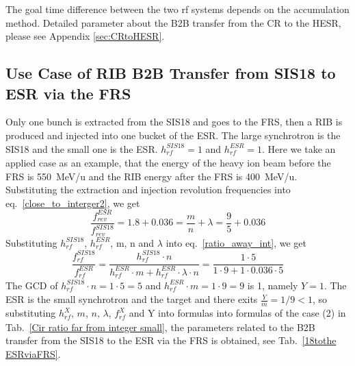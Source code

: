 The goal time difference between the two rf systems depends on the accumulation method. Detailed parameter about the B2B transfer from the CR to the HESR, please see Appendix \ref{sec:CRtoHESR}. 
\subsection{Use Case of RIB B2B Transfer from SIS18 to ESR via the FRS} 
Only one bunch is extracted from the SIS18 and goes to the FRS, then a RIB is produced and injected into one bucket of the ESR. The large synchrotron is the SIS18 and the small one is the ESR. $h^{\mathit{SIS18}}_\mathit{rf}=1$ and $h^{\mathit{ESR}}_\mathit{rf}=1$. Here we take an applied case as an example, that the energy of the heavy ion beam before the FRS is \SI{550}{MeV/\atomicmassunit} and the RIB energy after the FRS is \SI{400}{MeV/\atomicmassunit}. Substituting the extraction and injection revolution frequencies into eq.~\ref{close_to_interger2}, we get
\begin{equation} 
\frac{f_{\mathit{rev}}^{\mathit{ESR}}}{f_{\mathit{rev}}^{\mathit{SIS18}}}=1.8+0.036=\frac{m}{n}+ \lambda=\frac{9}{5}+0.036
\end{equation}
Substituting $h^{\mathit{SIS18}}_\mathit{rf}$, $h^{\mathit{ESR}}_\mathit{rf}$, m, n and $\lambda$ into eq.~\ref{ratio_away_int}, we get
\begin{equation}
\frac{f_{\mathit{rf}}^{\mathit{SIS18}}}{f_{\mathit{rf}}^{\mathit{ESR}}}=\frac{h^{\mathit{SIS18}}_\mathit{rf}\cdot n}{h^{\mathit{ESR}}_\mathit{rf} \cdot m+ h^{\mathit{ESR}}_\mathit{rf} \cdot\lambda\cdot n}=\frac{1\cdot 5}{1 \cdot 9+1 \cdot0.036\cdot 5}
\end{equation}
The GCD of $h^{\mathit{SIS18}}_\mathit{rf}\cdot n=1\cdot5=5$ and $h^{\mathit{ESR}}_\mathit{rf} \cdot m=1\cdot 9=9$ is 1, namely $Y=1$. The ESR is the small synchrotron and the target and there exits $\frac{Y}{m}=1/9<1$, so substituting $h^X_\mathit{rf}$, $m$, $n$, $\lambda$, $f_{\mathit{rf}}^{X}$ and Y into formulas into formulas of the case (2) in Tab.~\ref{Cir ratio far from integer small}, the parameters related to the B2B transfer from the SIS18 to the ESR via the FRS is obtained, see Tab.~\ref{18tothe ESRviaFRS}.
